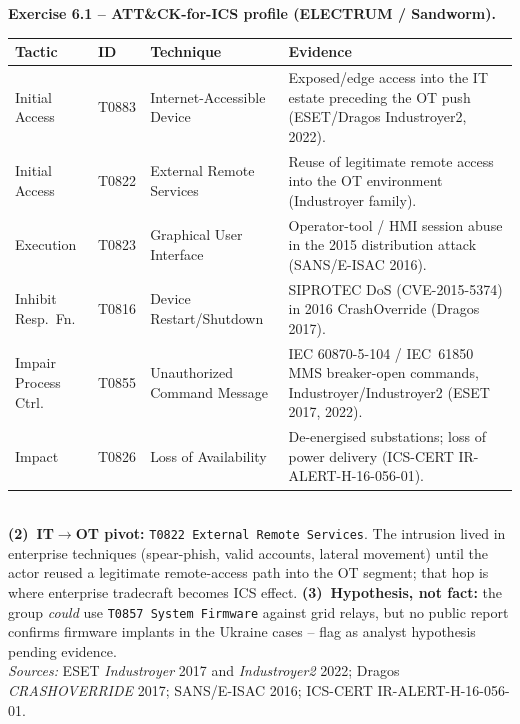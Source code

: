 \documentclass[11pt,a4paper]{article}
\begin{document}
\begin{solutionbox}
\textbf{Exercise 6.1 -- ATT\&CK-for-ICS profile (ELECTRUM / Sandworm).}\\[2pt]
\par\begin{tabular}{p{3.0cm} p{1.4cm} p{4.0cm} p{5.6cm}}
\toprule
\textbf{Tactic} & \textbf{ID} & \textbf{Technique} & \textbf{Evidence} \\
\midrule
Initial Access & T0883 & Internet-Accessible Device & Exposed/edge access into the IT estate
  preceding the OT push (ESET/Dragos Industroyer2, 2022). \\
Initial Access & T0822 & External Remote Services & Reuse of legitimate remote access into the
  OT environment (Industroyer family). \\
Execution & T0823 & Graphical User Interface & Operator-tool / HMI session abuse in the 2015
  distribution attack (SANS/E-ISAC 2016). \\
Inhibit Resp.\ Fn. & T0816 & Device Restart/Shutdown & SIPROTEC DoS (CVE-2015-5374) in 2016
  CrashOverride (Dragos 2017). \\
Impair Process Ctrl. & T0855 & Unauthorized Command Message & IEC 60870-5-104 / IEC~61850 MMS
  breaker-open commands, Industroyer/Industroyer2 (ESET 2017, 2022). \\
Impact & T0826 & Loss of Availability & De-energised substations; loss of power delivery
  (ICS-CERT IR-ALERT-H-16-056-01). \\
\bottomrule
\end{tabular}\\[3pt]
\textbf{(2)~IT$\to$OT pivot:} \texttt{T0822 External Remote Services}. The intrusion lived in
enterprise techniques (spear-phish, valid accounts, lateral movement) until the actor reused a
legitimate remote-access path into the OT segment; that hop is where enterprise tradecraft
becomes ICS effect. \textbf{(3)~Hypothesis, not fact:} the group \emph{could} use
\texttt{T0857 System Firmware} against grid relays, but no public report confirms firmware
implants in the Ukraine cases -- flag as analyst hypothesis pending evidence.\\[2pt]
\emph{Sources:} ESET \emph{Industroyer} 2017 and \emph{Industroyer2} 2022; Dragos
\emph{CRASHOVERRIDE} 2017; SANS/E-ISAC 2016; ICS-CERT IR-ALERT-H-16-056-01.
\end{solutionbox}
\end{document}
